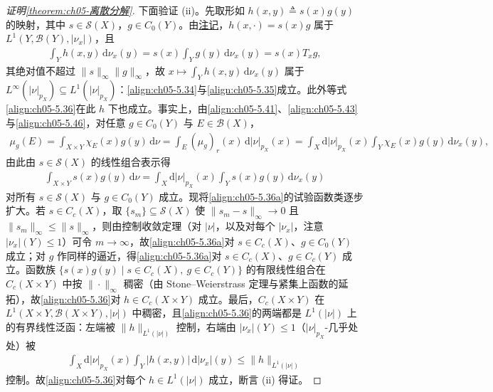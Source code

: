 \documentclass[../../main.tex]{subfiles}%
\begin{document}
\begin{proof}[证明\cref{theorem:ch05-离散分解}]
下面验证 (ii)。先取形如 $h(x,y)\triangleq s(x)g(y)$ 的映射，其中 $s\in\mathcal{S}(X)$，$g\in C_0(Y)$。由\hyperref[remark:ch05-参数测度等价]{注记}，$h(x,\cdot)=s(x)g$ 属于 $L^1(Y,\mathscr{B}(Y),|\nu_x|)$，且
\begin{align*}
\int_Y h(x,y)\,\mathrm{d}\nu_x(y)=s(x)\int_Y g(y)\,\mathrm{d}\nu_x(y)=s(x)T_xg,
\end{align*}
其绝对值不超过 $\|s\|_\infty\|g\|_\infty$，故 $x\mapsto\int_Y h(x,y)\,\mathrm{d}\nu_x(y)$ 属于 $L^\infty(|\nu|_{p_X})\subseteq L^1(|\nu|_{p_X})$：\eqref{align:ch05-5.34}与\eqref{align:ch05-5.35}成立。此外等式\eqref{align:ch05-5.36}在此 $h$ 下也成立。事实上，由\eqref{align:ch05-5.41}、\eqref{align:ch05-5.43}与\eqref{align:ch05-5.46}，对任意 $g\in C_0(Y)$ 与 $E\in\mathscr{B}(X)$，
\begin{align*}
\mu_g(E)=\int_{X\times Y}\chi_E(x)g(y)\,\mathrm{d}\nu
=\int_E(\mu_g)_r(x)\,\mathrm{d}|\nu|_{p_X}(x)
=\int_X\mathrm{d}|\nu|_{p_X}(x)\int_Y\chi_E(x)g(y)\,\mathrm{d}\nu_x(y),
\end{align*}
由此由 $s\in\mathcal{S}(X)$ 的线性组合表示得
\begin{align}
\int_{X\times Y}s(x)g(y)\,\mathrm{d}\nu
=\int_X\mathrm{d}|\nu|_{p_X}(x)\int_Y s(x)g(y)\,\mathrm{d}\nu_x(y)\label{align:ch05-5.36a}
\end{align}
对所有 $s\in\mathcal{S}(X)$ 与 $g\in C_0(Y)$ 成立。现将\eqref{align:ch05-5.36a}的试验函数类逐步扩大。若 $s\in C_c(X)$，取 $\{s_m\}\subseteq\mathcal{S}(X)$ 使 $\|s_m-s\|_\infty\to0$ 且 $\|s_m\|_\infty\leqslant\|s\|_\infty$，则由控制收敛定理（对 $|\nu|$，以及对每个 $|\nu_x|$，注意 $|\nu_x|(Y)\leqslant1$）可令 $m\to\infty$，故\eqref{align:ch05-5.36a}对 $s\in C_c(X)$、$g\in C_0(Y)$ 成立；对 $g$ 作同样的逼近，得\eqref{align:ch05-5.36a}对 $s\in C_c(X)$、$g\in C_c(Y)$ 成立。函数族 $\{s(x)g(y)\mid s\in C_c(X),\ g\in C_c(Y)\}$ 的有限线性组合在 $C_c(X\times Y)$ 中按 $\|\cdot\|_\infty$ 稠密（由 Stone--Weierstrass 定理与紧集上函数的延拓），故\eqref{align:ch05-5.36}对 $h\in C_c(X\times Y)$ 成立。最后，$C_c(X\times Y)$ 在 $L^1(X\times Y,\mathscr{B}(X\times Y),|\nu|)$ 中稠密，且\eqref{align:ch05-5.36}的两端都是 $L^1(|\nu|)$ 上的有界线性泛函：左端被 $\|h\|_{L^1(|\nu|)}$ 控制，右端由 $|\nu_x|(Y)\leqslant1$（$|\nu|_{p_X}$-几乎处处）被
\begin{align*}
\int_X\mathrm{d}|\nu|_{p_X}(x)\int_Y|h(x,y)|\,\mathrm{d}|\nu_x|(y)\leqslant\|h\|_{L^1(|\nu|)}
\end{align*}
控制。故\eqref{align:ch05-5.36}对每个 $h\in L^1(|\nu|)$ 成立，断言 (ii) 得证。


\end{proof}
\end{document}
